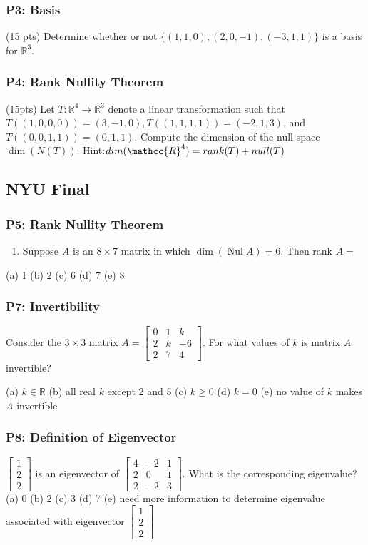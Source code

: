 \documentclass[11pt]{article}
\begin{document}
\subsubsection{P3: Basis}
\label{sec:org71f5799}
(15 pts) Determine whether or not \(\{(1,1,0),(2,0,-1),(-3,1,1)\}\) is a basis
for \(\mathbb{R}^{3}\).
\subsubsection{P4: Rank Nullity Theorem}
\label{sec:orgcd0e7c9}
(15pts) Let \(T: \mathbb{R}^{4} \rightarrow \mathbb{R}^{3}\) denote a linear
transformation such that \(T((1,0,0,0))= (3,-1,0), T((1,1,1,1))=(-2,1,3)\), and
\(T((0,0,1,1))=(0,1,1)\). Compute the dimension of the null space
\(\operatorname{dim}(N(T))\). Hint:\(dim(\mathcc{R}^{4}) = rank(T) + null(T)\)
\subsection{NYU Final}
\label{sec:org3f34889}
\subsubsection{P5: Rank Nullity Theorem}
\label{sec:org6fbb559}
\begin{enumerate}
\item Suppose \(A\) is an \(8 \times 7\) matrix in which \(\operatorname{dim}(\operatorname{Nul} A)=6\). Then rank \(A=\)
\end{enumerate}
(a) 1
(b) 2
(c) 6
(d) 7
(e) 8
\subsubsection{P7: Invertibility}
\label{sec:orgdb3c8bd}
Consider the \(3 \times 3\) matrix \(A=\left[\begin{array}{rrr}0 & 1 & k \\ 2 & k
 & -6 \\ 2 & 7 & 4\end{array}\right]\). For what values of \(k\) is matrix \(A\)
invertible?

(a) \(k \in \mathbb{R}\)
(b) all real \(k\) except 2 and 5
(c) \(k \geq 0\)
(d) \(k=0\)
(e) no value of \(k\) makes \(A\) invertible
\subsubsection{P8: Definition of Eigenvector}
\label{sec:orga2e7a96}
 \(\left[\begin{array}{l}1 \\ 2 \\ 2\end{array}\right]\) is an eigenvector of
   \(\left[\begin{array}{rrr}4 & -2 & 1 \\ 2 & 0 & 1 \\ 2 & -2 &
   3\end{array}\right]\). What is the corresponding eigenvalue?
(a) 0
(b) 2
(c) 3
(d) 7
(e) need more information to determine eigenvalue associated with eigenvector \(\left[\begin{array}{l}1 \\ 2 \\ 2\end{array}\right]\)
\end{document}

